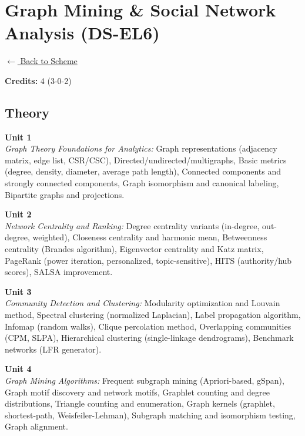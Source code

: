 \section*{Graph Mining \& Social Network Analysis (DS-EL6)}
\label{elec:DS_6}

\noindent \small{\hyperref[main:scheme]{$\leftarrow$ Back to Scheme}} \vspace{0.5cm}

\noindent \textbf{Credits:} 4 (3-0-2)

\subsection*{Theory}
\noindent\textbf{Unit 1} \\
\textit{Graph Theory Foundations for Analytics:} Graph representations (adjacency matrix, edge list, CSR/CSC), Directed/undirected/multigraphs, Basic metrics (degree, density, diameter, average path length), Connected components and strongly connected components, Graph isomorphism and canonical labeling, Bipartite graphs and projections.

\vspace{0.3cm}

\noindent\textbf{Unit 2} \\
\textit{Network Centrality and Ranking:} Degree centrality variants (in-degree, out-degree, weighted), Closeness centrality and harmonic mean, Betweenness centrality (Brandes algorithm), Eigenvector centrality and Katz matrix, PageRank (power iteration, personalized, topic-sensitive), HITS (authority/hub scores), SALSA improvement.

\vspace{0.3cm}

\noindent\textbf{Unit 3} \\
\textit{Community Detection and Clustering:} Modularity optimization and Louvain method, Spectral clustering (normalized Laplacian), Label propagation algorithm, Infomap (random walks), Clique percolation method, Overlapping communities (CPM, SLPA), Hierarchical clustering (single-linkage dendrograms), Benchmark networks (LFR generator).

\vspace{0.3cm}

\noindent\textbf{Unit 4} \\
\textit{Graph Mining Algorithms:} Frequent subgraph mining (Apriori-based, gSpan), Graph motif discovery and network motifs, Graphlet counting and degree distributions, Triangle counting and enumeration, Graph kernels (graphlet, shortest-path, Weisfeiler-Lehman), Subgraph matching and isomorphism testing, Graph alignment.

